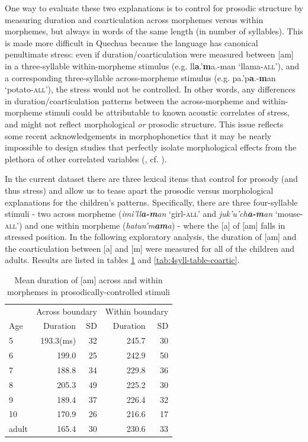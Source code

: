 \documentclass[a4paper,man,floatsintext,natbib,donotrepeattitle, apacite]{apa6}
\begin{document}
One way to evaluate these two explanations is to control for prosodic structure by measuring duration and coarticulation across morphemes versus within morphemes, but always in words of the same length (in number of syllables). This is made more difficult in Quechua because the language has canonical penultimate stress: even if duration/coarticulation were measured between [am] in a three-syllable within-morpheme stimulus (e.g. ll\textbf{a}.\textsf{'}\textbf{m}a.-man `llama-\textsc{all}'), and a corresponding three-syllable across-morpheme stimulus (e.g. pa.\textsf{'}p\textbf{a}.-\textbf{m}an `potato-\textsc{all}'), the stress would not be controlled. In other words, any differences in duration/coarticulation patterns between the across-morpheme and within-morpheme stimuli could be attributable to known acoustic correlates of stress, and might not reflect morphological \textit{or} prosodic structure. This issue reflects some recent acknowledgements in morphophonetics that it may be nearly impossible to design studies that perfectly isolate morphological effects from the plethora of other correlated variables (\citealt{strycharczukPhoneticDetailPhonetic2019}, cf. \citealt{seyfarthAcousticDifferencesMorphologicallydistinct2018}). 

In the current dataset there are three lexical items that control for prosody (and thus stress) and allow us to tease apart the prosodic versus morphological explanations for the children's patterns. Specifically, there are three four-syllable stimuli - two across morpheme (\textit{imi\textsf{'}ll\textbf{a-m}an} `girl-\textsc{all}' and \textit{juk'u\textsf{'}ch\textbf{a-m}an
} `mouse-\textsc{all}') and one within morpheme (\textit{hatun\textsf{'}m\textbf{am}a}) - where the [a] of [am] falls in stressed position. In the following exploratory analysis, the duration of [am] and the coarticulation between [a] and [m] were measured for all of the children and adults. Results are listed in tables \ref{tab:4syll-table-dur} and \ref{tab:4syll-table-coartic}. 

 \begin{table}[H]
\caption{\label{tab:4syll-table-dur}Mean duration of [am] across and within morphemes in prosodically-controlled stimuli}
\centering
\begin{tabular}[t]{lrrrr}
\toprule
\multicolumn{1}{c}{ } & \multicolumn{2}{c}{Across boundary} & \multicolumn{2}{c}{Within boundary} \\
\cmidrule(l{3pt}r{3pt}){2-3} \cmidrule(l{3pt}r{3pt}){4-5}
Age & Duration  & SD  & Duration & SD\\
\midrule
 5 & 193.3(ms)  & 32 & 245.7 & 30 \\
 6 & 199.0  & 25 & 242.9  & 50 \\
 7 & 188.8  & 34 & 229.8  & 36 \\
 8 & 205.3  & 49 & 225.2  & 30 \\
 9 & 189.4  & 37 & 226.4  & 32 \\
 10 & 170.9 & 26 & 216.6 & 17 \\
adult & 165.4 & 30 & 230.6 & 33 \\
\bottomrule
\end{tabular}
\end{table}
\end{document}
